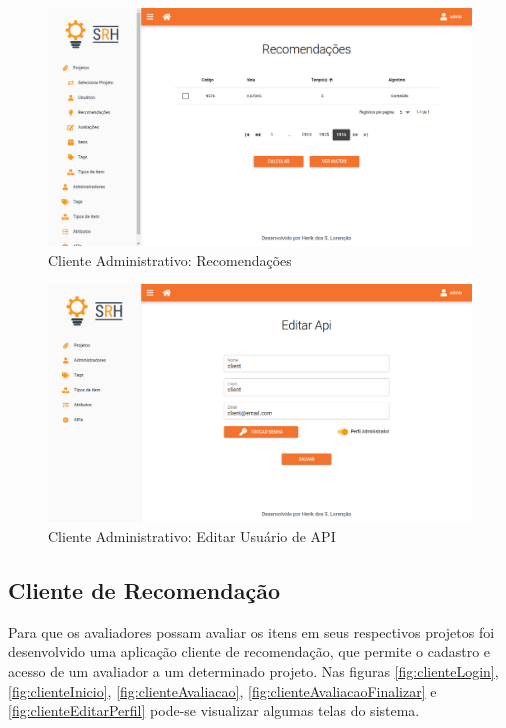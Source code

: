 \begin{figure}[H]
	\centering
	\includegraphics[width=.9\linewidth]{imagens/adminRecomendacoes.png}
	\caption[Cliente Administrativo: Recomendações]{Cliente Administrativo: Recomendações}
    \label{fig:clienteAdminRecomendacoes}
\end{figure}

\begin{figure}[H]
	\centering
	\includegraphics[width=.9\linewidth]{imagens/adminApi.png}
	\caption[Cliente Administrativo - Login]{Cliente Administrativo: Editar Usuário de API}
    \label{fig:clienteAdminUsuarioAPI}
\end{figure}

\subsection{Cliente de Recomendação}

Para que os avaliadores possam avaliar os itens em seus respectivos projetos foi desenvolvido uma aplicação cliente de recomendação, que permite o cadastro e acesso de um avaliador a um determinado projeto. Nas figuras \ref{fig:clienteLogin}, \ref{fig:clienteInicio}, \ref{fig:clienteAvaliacao}, \ref{fig:clienteAvaliacaoFinalizar} e \ref{fig:clienteEditarPerfil} pode-se visualizar algumas telas do sistema.

